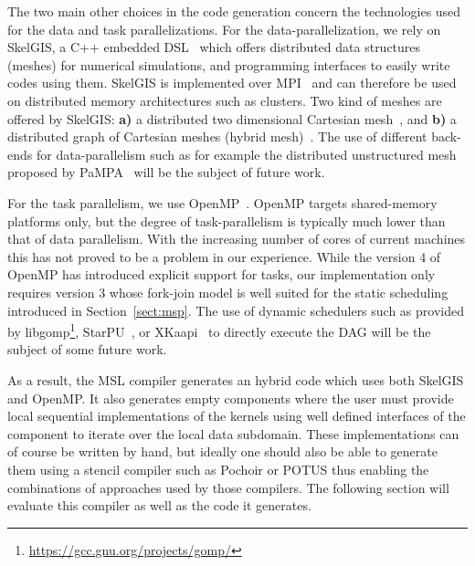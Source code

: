 The two main other choices in the code generation concern the technologies used for the data and task parallelizations.
For the data-parallelization, we rely on SkelGIS, a C++ embedded DSL~\cite{CPE:CPE3494} which offers distributed data structures (meshes) for numerical simulations, and programming interfaces to easily write codes using them.
SkelGIS is implemented over MPI~\cite{Graham2009MSE} and can therefore be used on distributed memory architectures such as clusters.
Two kind of meshes are offered by SkelGIS: \textbf{a)} a distributed two dimensional Cartesian mesh~\cite{DBLP:conf/ieeehpcs/HeleneS13}, and \textbf{b)} a distributed graph of Cartesian meshes (hybrid mesh)~\cite{DBLP:conf/europar/CoullonL14}.
The use of different back-ends for data-parallelism such as for example the distributed unstructured mesh proposed by PaMPA~\cite{lachat:hal-00768916} will be the subject of future work.

For the task parallelism, we use OpenMP~\cite{660313}.
OpenMP targets shared-memory platforms only, but the degree of task-parallelism is typically much lower than that of data parallelism.
With the increasing number of cores of current machines this has not proved to be a problem in our experience.
While the version 4 of OpenMP has introduced explicit support for tasks, our implementation only requires version 3 whose fork-join model is well suited for the static scheduling introduced in Section~\ref{sect:msp}.
The use of dynamic schedulers such as provided by libgomp\footnote{\url{https://gcc.gnu.org/projects/gomp/}}, StarPU~\cite{Augonnet2011}, or XKaapi~\cite{Gautier:2013:XRS:2510661.2511383} to directly execute the DAG will be the subject of some future work.

As a result, the MSL compiler generates an hybrid code which uses both SkelGIS and OpenMP.
It also generates empty components where the user must provide local sequential implementations of the kernels using well defined interfaces of the component to iterate over the local data subdomain.
These implementations can of course be written by hand, but ideally one should also be able to generate them using a stencil compiler such as Pochoir or POTUS thus enabling the combinations of approaches used by those compilers.
The following section will evaluate this compiler as well as the code it generates.
